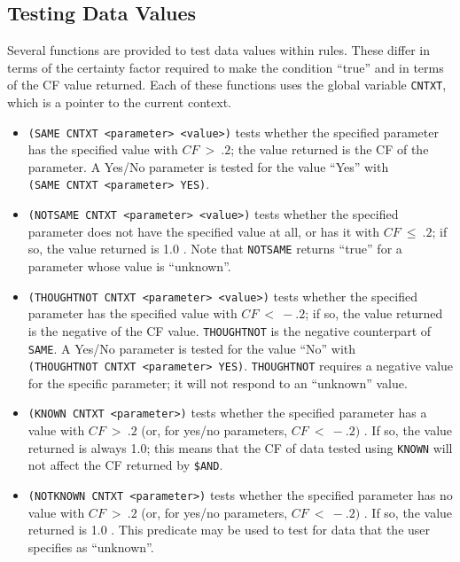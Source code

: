 \subsection{Testing Data Values}

Several functions are provided to test data values within rules.  These differ
in terms of the certainty factor required to make the condition ``true'' and
in terms of the CF value returned.  Each of these functions uses the global
variable {\tt CNTXT}, which is a pointer to the current context.
\begin{itemize}
\item {\tt (SAME CNTXT <parameter> <value>)} tests whether the specified
parameter has the specified value with $ CF\ >\ .2 $; the value returned
is the CF of the parameter.  A Yes/No parameter is tested for the value
``Yes'' with {\tt (SAME\ CNTXT\ <parameter>\ YES)}.

\item {\tt (NOTSAME CNTXT <parameter> <value>)} tests whether the
specified parameter does not have the specified value at all, or has it
with $ CF\ \leq \ .2 $; if so, the value returned is 1.0 .  Note that
{\tt NOTSAME} returns ``true'' for a parameter whose value is ``unknown''.

\item {\tt (THOUGHTNOT CNTXT <parameter> <value>)} tests whether the
specified parameter has the specified value with $ CF\ <\ -.2 $; if so,
the value returned is the negative of the CF value.  {\tt THOUGHTNOT} is
the negative counterpart of {\tt SAME}. A Yes/No parameter is tested for
the value ``No'' with {\tt (THOUGHTNOT\ CNTXT\ <parameter>\ YES)}.
{\tt THOUGHTNOT} requires a negative value for the specific parameter;
it will not respond to an ``unknown'' value.

\item {\tt (KNOWN CNTXT <parameter>)} tests whether the specified parameter
has a value with $ CF\ >\ .2 $ (or, for yes/no parameters, $ CF\ <\ -.2) $ .
If so, the value returned is always 1.0; this means that the CF of data
tested using {\tt KNOWN} will not affect the CF returned by {\tt \$AND}.

\item {\tt (NOTKNOWN CNTXT <parameter>)} tests whether the specified parameter
has no value with $ CF\ >\ .2 $ (or, for yes/no parameters, $ CF\ <\ -.2) $ .
If so, the value returned is 1.0 .  This predicate may be used to test for
data that the user specifies as ``unknown''.
\end{itemize}


